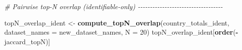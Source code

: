 \documentclass[
  11pt,
]{article}
\newenvironment{Shaded}{\begin{snugshade}}{\end{snugshade}}
\newcommand{\AttributeTok}[1]{\textcolor[rgb]{0.13,0.29,0.53}{#1}}
\newcommand{\CommentTok}[1]{\textcolor[rgb]{0.56,0.35,0.01}{\textit{#1}}}
\newcommand{\DecValTok}[1]{\textcolor[rgb]{0.00,0.00,0.81}{#1}}
\newcommand{\FunctionTok}[1]{\textcolor[rgb]{0.13,0.29,0.53}{\textbf{#1}}}
\newcommand{\NormalTok}[1]{#1}
\newcommand{\OtherTok}[1]{\textcolor[rgb]{0.56,0.35,0.01}{#1}}
\newcommand{\SpecialCharTok}[1]{\textcolor[rgb]{0.81,0.36,0.00}{\textbf{#1}}}
\begin{document}
\begin{Shaded}
\begin{Highlighting}[]
\CommentTok{\# Pairwise top{-}N overlap (identifiable{-}only) {-}{-}{-}{-}{-}{-}{-}{-}{-}{-}{-}{-}{-}{-}{-}{-}{-}{-}{-}{-}{-}{-}{-}{-}{-}{-}{-}{-}{-}{-}{-}{-}{-}{-}{-}}

\NormalTok{topN\_overlap\_ident }\OtherTok{\textless{}{-}} \FunctionTok{compute\_topN\_overlap}\NormalTok{(country\_totals\_ident,}
                                           \AttributeTok{dataset\_names =}\NormalTok{ new\_dataset\_names,}
                                           \AttributeTok{N =} \DecValTok{20}\NormalTok{)}
\NormalTok{topN\_overlap\_ident[}\FunctionTok{order}\NormalTok{(}\SpecialCharTok{{-}}\NormalTok{jaccard\_topN)]}
\end{Highlighting}
\end{Shaded}
\end{document}
